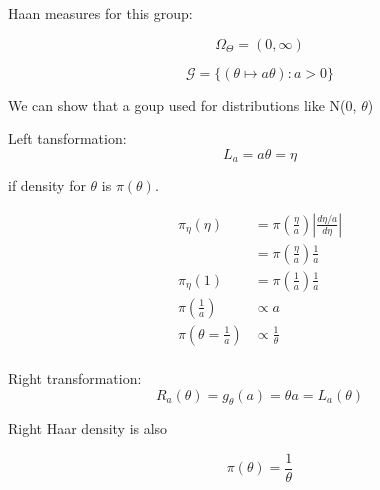 \documentclass[11pt,fleqn]{book} %
\begin{document}
\begin{example}
	Haan measures for this group:

			$$\Omega_\Theta = (0, \infty) $$

			$$\mathcal{G} = \{(\theta \mapsto a\theta): a > 0 \} $$

	We can show that a goup used for distributions like N(0, $\theta$)

	Left tansformation:\\

			$$L_a = a\theta = \eta $$

	if density for $\theta$ is $\pi(\theta)$. 

			\begin{align*}
				\pi_\eta(\eta) &= \pi(\frac{\eta}{a}) |\frac{d \eta/a}{d \eta}|\\
						&=\pi\left(\frac{\eta}{a}\right) \frac{1}{a}\\
				\pi_\eta(1) &= \pi\left(\frac{1}{a}\right)\frac{1}{a}\\
				\pi(\frac{1}{a}) &\propto a\\
				\pi(\theta = \frac{1}{a}) &\propto \frac{1}{\theta}\\
			\end{align*}

	Right transformation:\\

			$$R_a(\theta) = g_\theta(a) = \theta a = L_a(\theta)$$

	Right Haar density is also 

			$$\pi(\theta) = \frac{1}{\theta} $$
\end{example}
\end{document}
